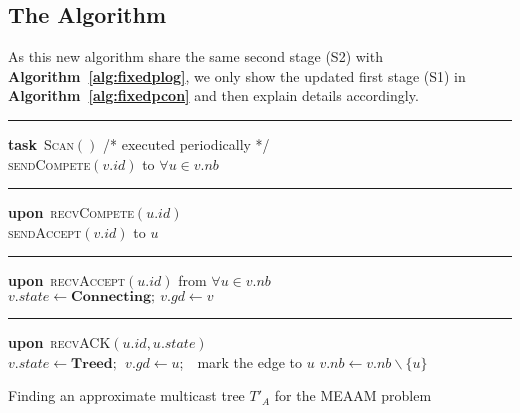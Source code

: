 \documentclass[10pt, conference, compsocconf]{IEEEtran}
\begin{document}
  \subsection{The Algorithm}
As this new algorithm share the same second stage (S2) with \textbf{Algorithm~\ref{alg:fixedplog}}, we only show the updated first stage (S1) in \textbf{Algorithm~\ref{alg:fixedpcon}} and then explain details accordingly.
\begin{algorithm}[h!]
\hrule
\textbf{task}~\textsc{Scan}$()$  \hfill /* \textsf{\small executed periodically} */ \\
       {
        \textsc{sendCompete}$(v.\mathit{id})$ to $\forall u \in v.\mathit{nb}$ \\
}
\hrule
\textbf{upon}~\textsc{recvCompete}$(u.\mathit{id})$ \\
 { \label{ln:loser}
         {
          \textsc{sendAccept}$(v.\mathit{id})$ to $u$  \label{ln:acceptcv}
        }
      }
\hrule
\textbf{upon}~\textsc{recvAccept}$(u.\mathit{id})$ from $\forall u \in v.\mathit{nb}$ \label{ln:allaccept} \\
      $v.\mathit{state} \leftarrow \mathbf{Connecting};~v.\mathit{gd} \leftarrow v$ \label{ln:joinc}
\hrule
\textbf{upon}~\textsc{recvACK}$(u.\mathit{id}, u.\mathit{state})$ \\
 {
        $v.\mathit{state} \leftarrow \mathbf{Treed};~~v.\mathit{gd} \leftarrow u$;~~mark the edge to $u$ \label{ln:covered}
      }
       {
        $v.\mathit{nb} \leftarrow v.\mathit{nb} \backslash \{u\}$ \label{ln:updatenb}
      }
\caption{Finding an approximate multicast tree $T'_A$ for the MEAAM problem} \label{alg:fixedpcon}
    \end{algorithm}
\end{document}
